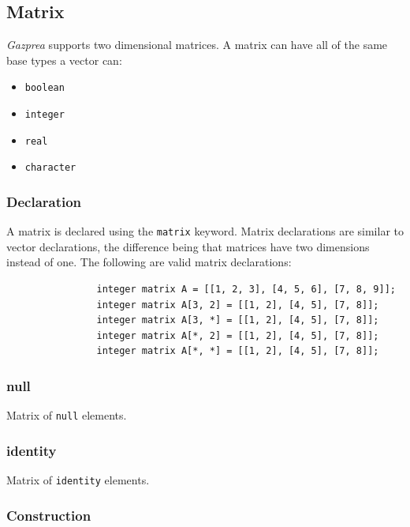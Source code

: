 \documentclass{article}
\begin{document}
	\subsection{Matrix}\label{sec:matrix}

		\textit{Gazprea} supports two dimensional matrices. A matrix can have all of the same base types a vector can:

		\begin{itemize}
			\item \texttt{boolean}
			\item \texttt{integer}
			\item \texttt{real}
			\item \texttt{character}
		\end{itemize}

		\subsubsection{Declaration}

			A matrix is declared using the \texttt{matrix} keyword. Matrix declarations are similar to vector
			declarations, the difference being that matrices have two dimensions instead of one. The following are
			valid matrix declarations:

			\begin{lstlisting}
				integer matrix A = [[1, 2, 3], [4, 5, 6], [7, 8, 9]];
				integer matrix A[3, 2] = [[1, 2], [4, 5], [7, 8]];
				integer matrix A[3, *] = [[1, 2], [4, 5], [7, 8]];
				integer matrix A[*, 2] = [[1, 2], [4, 5], [7, 8]];
				integer matrix A[*, *] = [[1, 2], [4, 5], [7, 8]];
			\end{lstlisting}

		\subsubsection{null}

			Matrix of \texttt{null} elements.

		\subsubsection{identity}

			Matrix of \texttt{identity} elements.

		\subsubsection{Construction}
\end{document}
